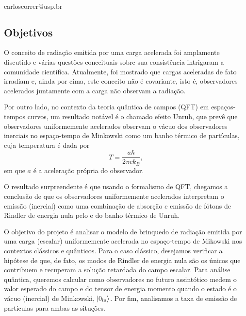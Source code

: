 \documentclass[10pt]{article}
\begin{document}
\begin{center}
    \fontsize{13}{\baselineskip}\\
    \vspace*{2mm}
    carloscorrer@usp.br
\end{center}
\vspace*{2mm}

\begin{multicols*}{2}
    \section*{Objetivos}
    O conceito de radiação emitida por uma carga acelerada foi amplamente discutido e várias questões conceituais sobre sua consistência intrigaram a comunidade científica. Atualmente, foi mostrado \cite{boulware} que cargas aceleradas de fato irradiam e, ainda por cima, este conceito não é covariante, isto é, observadores acelerados juntamente com a carga não observam a radiação.

    Por outro lado, no contexto da teoria quântica de campos (QFT) em espaços-tempos curvos, um resultado notável é o chamado efeito Unruh, que prevê que observadores uniformemente acelerados observam o vácuo dos observadores inerciais no espaço-tempo de Minkowski como um banho térmico de partículas, cuja temperatura é dada por
    \begin{equation}
        T=\frac{a\hbar}{2\pi ck_B},
    \end{equation}
    em que \(a\) é a aceleração própria do observador.

    O resultado surpreendente é que usando o formalismo de QFT, chegamos a conclusão de que os observadores uniformemente acelerados interpretam o emissão (inercial) como uma combinação de absorção e emissão de fótons de Rindler de energia nula pelo e do banho térmico de Unruh.

    O objetivo do projeto é analisar o modelo de brinquedo de radiação emitida por uma carga (escalar) uniformemente acelerada no espaço-tempo de Mikowski nos contextos clássicos e quânticos. Para o caso clássico, desejamos verificar a hipótese de que, de fato, os modos de Rindler de energia nula são os únicos que contribuem e recuperam a solução retardada do campo escalar. Para análise quântica, queremos calcular como observadores no futuro assintótico medem o valor esperado do campo e do tensor de energia momento quando o estado é o vácuo (inercial) de Minkowski, \(\ket{0_\text{in}}\). Por fim, analisamos a taxa de emissão de partículas para ambas as situções.


\end{multicols*}
\end{document}

